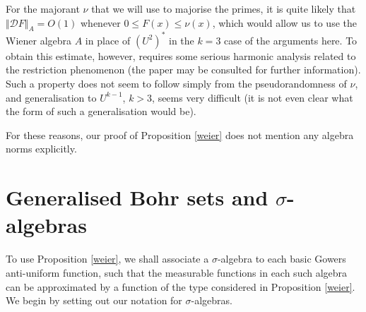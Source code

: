 \documentclass[12pt,a4paper,reqno]{amsart}
\numberwithin{equation}{section}
\theoremstyle{plain}
\theoremstyle{definition}
\renewcommand{\leq}{\leqslant}
\def\vs{\vspace{11pt}}
\def\ni{\noindent}
\begin{document}
\ni For the majorant $\nu$ that we will use to majorise the primes, it is quite likely that $\Vert \mathcal{D}F \Vert_A = O(1)$ whenever $0 \leq F(x) \leq \nu(x)$, which would allow us to use the Wiener algebra $A$ in place of $(U^2)^*$ in the $k=3$ case of the arguments here. To obtain this estimate, however, requires some serious harmonic analysis related to the restriction phenomenon (the paper \cite{green-tao} may be consulted for further information). Such a property does not seem to follow simply from the pseudorandomness of $\nu$, and generalisation to $U^{k-1}$, $k > 3$, seems very difficult (it is not even clear what the form of such a generalisation would be). \vs

\ni For these reasons, our proof of Proposition \ref{weier} does not mention any algebra norms explicitly.

\section{Generalised Bohr sets and $\sigma$-algebras}

\ni To use Proposition \ref{weier}, we shall associate a $\sigma$-algebra to each basic Gowers anti-uniform function, such that the measurable
functions in each such algebra can be approximated by a function of the type considered in Proposition \ref{weier}.  We begin by setting out
our notation for $\sigma$-algebras.
\end{document}
